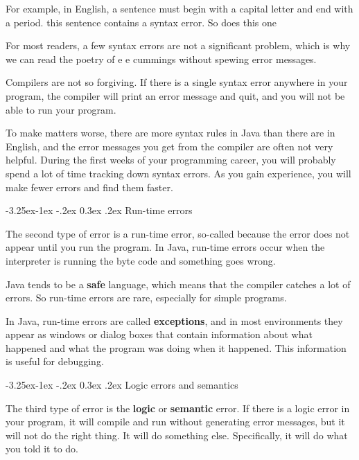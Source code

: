 \documentclass{book}
\makeatletter
\renewcommand\subsection{\@startsection {subsection}{2}{0mm}%
    {-3.25ex\@plus -1ex \@minus -.2ex}%
    {0.3ex \@plus .2ex}%
    {\normalfont\large\bfseries}}
\makeatother
\begin{document}
For example, in English, a sentence must begin with a capital
letter and end with a period.  this sentence contains a syntax
error.  So does this one

For most readers, a few syntax errors are not a significant
problem, which is why we can read the poetry of e e cummings
without spewing error messages.

Compilers are not so forgiving.  If there is a single syntax
error anywhere in your program, the compiler will print an
error message and quit, and you will not be able to run
your program.

To make matters worse, there are more syntax rules in Java
than there are in English, and the error messages you get from
the compiler are often not very helpful.  During the first
weeks of your programming career, you will probably
spend a lot of time tracking down syntax errors.  As you
gain experience, you will make fewer errors and find
them faster.

\subsection{Run-time errors}
\label{run-time}

The second type of error is a run-time error, so-called because
the error does not appear until you run the program.  In Java,
run-time errors occur when the interpreter is running the byte
code and something goes wrong.

Java tends to be a {\bf safe}
language, which means that the compiler catches a lot of errors.
So run-time errors are rare, especially
for simple programs.

In Java, run-time errors are called {\bf exceptions},
and in most environments they appear as windows or dialog
boxes that contain information about what happened and what
the program was doing when it happened.  This information is
useful for debugging.

\subsection{Logic errors and semantics}

The third type of error is the {\bf logic} or {\bf semantic} error.
If there is a logic error in your program, it will compile and run
without generating error messages, but it will not do the right thing.
It will do something else.  Specifically, it will do what you told it
to do.
\end{document}
